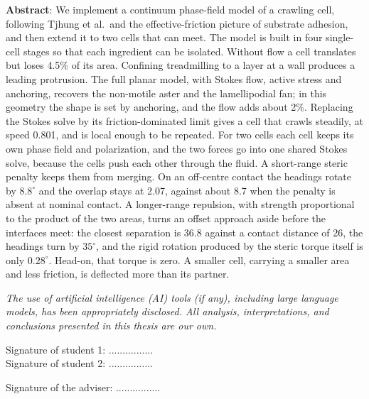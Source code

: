 \documentclass[11pt]{article}
\begin{document}
\vspace*{0.3cm}
\noindent
\textbf{Abstract}: We implement a continuum phase-field model of a crawling cell, following Tjhung et al.\ and the effective-friction picture of substrate adhesion, and then extend it to two cells that can meet. The model is built in four single-cell stages so that each ingredient can be isolated. Without flow a cell translates but loses 4.5\% of its area. Confining treadmilling to a layer at a wall produces a leading protrusion. The full planar model, with Stokes flow, active stress and anchoring, recovers the non-motile aster and the lamellipodial fan; in this geometry the shape is set by anchoring, and the flow adds about 2\%. Replacing the Stokes solve by its friction-dominated limit gives a cell that crawls steadily, at speed 0.801, and is local enough to be repeated. For two cells each cell keeps its own phase field and polarization, and the two forces go into one shared Stokes solve, because the cells push each other through the fluid. A short-range steric penalty keeps them from merging. On an off-centre contact the headings rotate by $8.8^{\circ}$ and the overlap stays at 2.07, against about 8.7 when the penalty is absent at nominal contact. A longer-range repulsion, with strength proportional to the product of the two areas, turns an offset approach aside before the interfaces meet: the closest separation is 36.8 against a contact distance of 26, the headings turn by $35^{\circ}$, and the rigid rotation produced by the steric torque itself is only $0.28^{\circ}$. Head-on, that torque is zero. A smaller cell, carrying a smaller area and less friction, is deflected more than its partner.

\vspace*{0.25cm}
\noindent
\textit{The use of artificial intelligence (AI) tools (if any), including large language models, has been appropriately disclosed. All analysis, interpretations, and conclusions presented in this thesis are our own.}

\vspace*{0.45cm}
\begin{flushleft}
Signature of student 1: ................ \\
\vspace*{0.25cm}
Signature of student 2: ................
\end{flushleft}

\vspace*{-0.9cm}

\begin{flushright}
Signature of the adviser: ................
\end{flushright}
\end{document}
